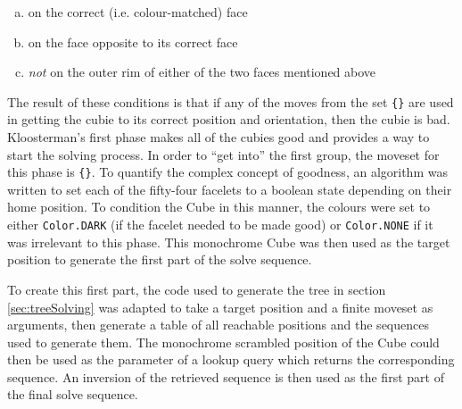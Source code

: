 \documentclass{report}
\newcommand{\tit}[1]{\textit{#1}}
\newcommand{\moveset}[1]{\uppercase{\texttt{\{\formatmoves{#1}\}}}}
\begin{document}
	\begin{enumerate}[a)]
		\item on the correct (i.e. colour-matched) face
		\item on the face opposite to its correct face
		\item \tit{not} on the outer rim of either of the two faces mentioned above
	\end{enumerate}

	The result of these conditions is that if any of the moves from the set \moveset{u.u'd.d@} are used in getting the cubie to its correct position and orientation, then the cubie is bad. Kloosterman's first phase makes all of the cubies good and provides a way to start the solving process. In order to \enquote{get into} the first group, the moveset for this phase is \moveset{u'd'l'r'f'b@}. To quantify the complex concept of goodness, an algorithm was written to set each of the fifty-four facelets to a boolean state depending on their home position. To condition the Cube in this manner, the colours were set to either \lstinline|Color.DARK| (if the facelet needed to be made good) or \lstinline|Color.NONE| if it was irrelevant to this phase. This monochrome Cube was then used as the target position to generate the first part of the solve sequence.
	
	To create this first part, the code used to generate the tree in section \ref{sec:treeSolving} was adapted to take a target position and a finite moveset as arguments, then generate a table of all reachable positions and the sequences used to generate them. The monochrome scrambled position of the Cube could then be used as the parameter of a lookup query which returns the corresponding sequence. An inversion of the retrieved sequence is then used as the first part of the final solve sequence.
	
\end{document}
